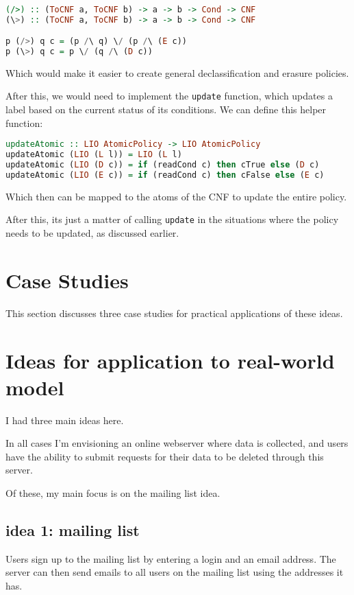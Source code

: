 \documentclass[11pt, oneside]{article}   	%
\begin{document}
\begin{lstlisting}[language=Haskell]

(/>) :: (ToCNF a, ToCNF b) -> a -> b -> Cond -> CNF
(\>) :: (ToCNF a, ToCNF b) -> a -> b -> Cond -> CNF

p (/>) q c = (p /\ q) \/ (p /\ (E c))
p (\>) q c = p \/ (q /\ (D c))

\end{lstlisting}

Which would make it easier to create general declassification and erasure policies. 

After this, we would need to implement the \texttt{update} function, which updates a label based on the current status of its conditions. We can define this helper function:

\begin{lstlisting}[language=Haskell]
updateAtomic :: LIO AtomicPolicy -> LIO AtomicPolicy
updateAtomic (LIO (L l)) = LIO (L l)
updateAtomic (LIO (D c)) = if (readCond c) then cTrue else (D c)
updateAtomic (LIO (E c)) = if (readCond c) then cFalse else (E c)
\end{lstlisting}

Which then can be mapped to the atoms of the CNF to update the entire policy.

After this, its just a matter of calling \texttt{update} in the situations where the policy needs to be updated, as discussed earlier.

\break
\section{Case Studies}
This section discusses three case studies for practical applications of these ideas.

\section{Ideas for application to real-world model}

I had three main ideas here.

In all cases I'm envisioning an online webserver where data is collected, and users have the ability to submit requests for their data to be deleted through this server.

Of these, my main focus is on the mailing list idea.

\subsection{idea 1: mailing list}
Users sign up to the mailing list by entering a login and an email address. The server can then send emails to all users on the mailing list using the addresses it has. 
\end{document}
